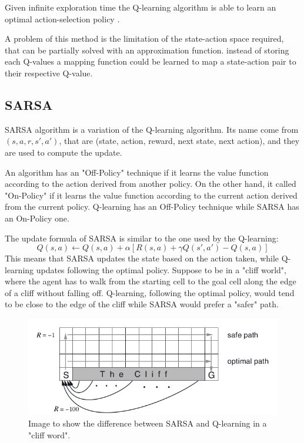 Given infinite exploration time the Q-learning algorithm is able to learn an optimal action-selection policy \cite{melo2001convergence}.

A problem of this method is the limitation of the state-action space required, that can be partially solved with an approximation function.
instead of storing each Q-values a mapping function could be learned to map a state-action pair to their respective Q-value.

\subsection{SARSA}
SARSA algorithm \cite{qiang2011reinforcement} is a variation of the Q-learning algorithm.
Its name come from $(s, a, r, s', a')$, that are (state, action, reward, next state, next action), and they are used to compute the update.

An algorithm has an "Off-Policy" technique if it learns the value function according to the action derived from another policy. On the other hand, it called "On-Policy" if it learns the value function according to the current action derived from the current policy.
Q-learning has an Off-Policy technique while SARSA has an On-Policy one.

The update formula of SARSA is similar to the one used by the Q-learning:
\begin{equation}
    Q(s, a) \leftarrow Q(s, a) + \alpha [R(s, a) + \gamma Q(s', a') - Q(s, a)]
\end{equation}
%
This means that SARSA updates the state based on the action taken, while Q-learning updates following the optimal policy.
Suppose to be in a "cliff world", where the agent has to walk from the starting cell to the goal cell along the edge of a cliff without falling off. Q-learning, following the optimal policy, would tend to be close to the edge of the cliff while SARSA would prefer a "safer" path.

\begin{figure}[ht]
    \centering
    \includegraphics[scale=0.4]{images/cliff_word.png}
    \caption{Image to show the difference between SARSA and Q-learning in a "cliff word".}
\end{figure}

